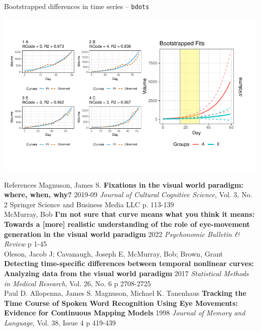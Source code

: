 \documentclass{beamer}
\begin{document}
\begin{frame}{Bootstrapped differences in time series -- \texttt{bdots}}
\vspace{-1mm}
\begin{center}
\includegraphics{bdots_examples.pdf}
\end{center}
\end{frame}




\begin{frame}{References}\small
Magnuson, James S. \textbf{Fixations in the visual world paradigm: where, when, why?} 2019-09 \textit{Journal of Cultural Cognitive Science}, Vol. 3, No. 2 Springer  Science and Business Media LLC p. 113-139 \newline \\

McMurray, Bob \textbf{I'm not sure that curve means what you think it means: Towards a [more] realistic understanding of the role of eye-movement generation in the visual world paradigm} 2022 \textit{Psychonomic Bulletin \& Review} p 1-45 \newline \\

Oleson, Jacob J; Cavanaugh, Joseph E, McMurray, Bob; Brown, Grant \textbf{Detecting time-specific differences between temporal nonlinear curves: Analyzing data from the visual world paradigm} 2017 \textit{Statistical Methods in Medical Research}, Vol. 26, No. 6 p 2708-2725 \newline \\

Paul D. Allopenna, James S. Magnuson, Michael K. Tanenhaus
\textbf{Tracking the Time Course of Spoken Word Recognition Using Eye Movements: Evidence for Continuous Mapping Models} 1998 \textit{Journal of Memory and Language}, Vol. 38, Issue 4 p 419-439

\end{frame}
\end{document}
